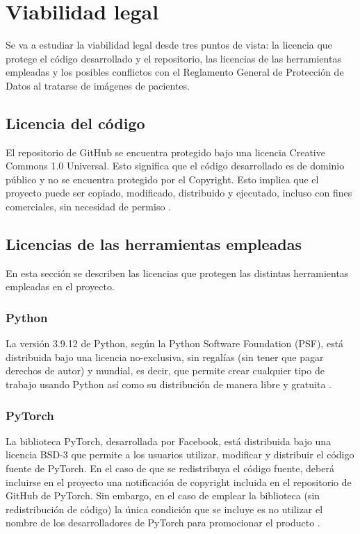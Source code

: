 \section{Viabilidad legal}

Se va a estudiar la viabilidad legal desde tres puntos de vista: la licencia que protege el código desarrollado y el repositorio, las licencias de las herramientas empleadas y los posibles conflictos con el Reglamento General de Protección de Datos al tratarse de imágenes de pacientes.

\subsection{Licencia del código}

El repositorio de GitHub se encuentra protegido bajo una licencia Creative Commons 1.0 Universal. Esto significa que el código desarrollado es de dominio público y no se encuentra protegido por el Copyright. Esto implica que el proyecto puede ser copiado, modificado, distribuido y ejecutado, incluso con fines comerciales, sin necesidad de permiso \cite{ccommons}.

\subsection{Licencias de las herramientas empleadas}

En esta sección se describen las licencias que protegen las distintas herramientas empleadas en el proyecto.

\subsubsection{Python}

La versión 3.9.12 de Python, según la Python Software Foundation (PSF), está distribuida bajo una licencia no-exclusiva, sin regalías (sin tener que pagar derechos de autor) y mundial, es decir, que permite crear cualquier tipo de trabajo usando Python así como su distribución de manera libre y gratuita \cite{licenc:python}.

\subsubsection{PyTorch}

La biblioteca PyTorch, desarrollada por Facebook, está distribuida bajo una licencia BSD-3 que permite a los usuarios utilizar, modificar y distribuir el código fuente de PyTorch. En el caso de que se redistribuya el código fuente, deberá incluirse en el proyecto una notificación de copyright incluida en el repositorio de GitHub de PyTorch. Sin embargo, en el caso de emplear la biblioteca (sin redistribución de código) la única condición que se incluye es no utilizar el nombre de los desarrolladores de PyTorch para promocionar el producto \cite{licenc:pytorch}.

